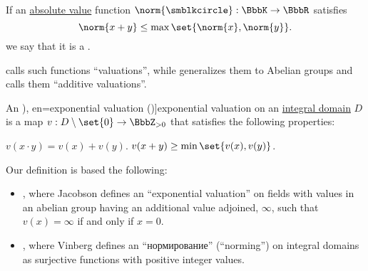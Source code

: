 \begin{definition}\label{def:non_archimedean_absolute_value}
  If an \hyperref[def:absolute_value]{absolute value} function \( \norm{\anon}: \BbbK \to \BbbR \) satisfies
  \begin{equation}\label{eq:def:non_archimedean_absolute_value}
    \norm{x + y} \leq \max\set{ \norm{x}, \norm{y} }.
  \end{equation}
  we say that it is a .
\end{definition}
\begin{comments}
  \item {} calls such functions \enquote{valuations}, while \cite[def. 9.4']{Jacobson1989AlgebraII} generalizes them to Abelian groups and calls them \enquote{additive valuations}.
\end{comments}

\begin{definition}\label{def:exponential_valuation}
  An \term[ru=нормирование (\cite[437]{Винберг2014Алгебра}), en=exponential valuation (\cite[def. 9.4']{Jacobson1989AlgebraII})]{exponential valuation} on an \hyperref[def:integral_domain]{integral domain} \( D \) is a map \( v: D \setminus \set{ 0 } \to \BbbZ_{>0} \) that satisfies the following properties:
  \begin{thmenum}
     \( v(x \cdot y) = v(x) + v(y) \).
     \( v(x + y) \geq \min\set{ v(x), v(y) } \).
  \end{thmenum}
\end{definition}
\begin{comments}
  \item Our definition is based the following:
  \begin{itemize}
    \item {}, where Jacobson defines an \enquote{exponential valuation} on fields with values in an abelian group having an additional value adjoined, \( \infty \), such that \( v(x) = \infty \) if and only if \( x = 0 \).

    \item {}, where Vinberg defines an \enquote{нормирование} (\enquote{norming}) on integral domains as surjective functions with positive integer values.
  \end{itemize}
\end{comments}

